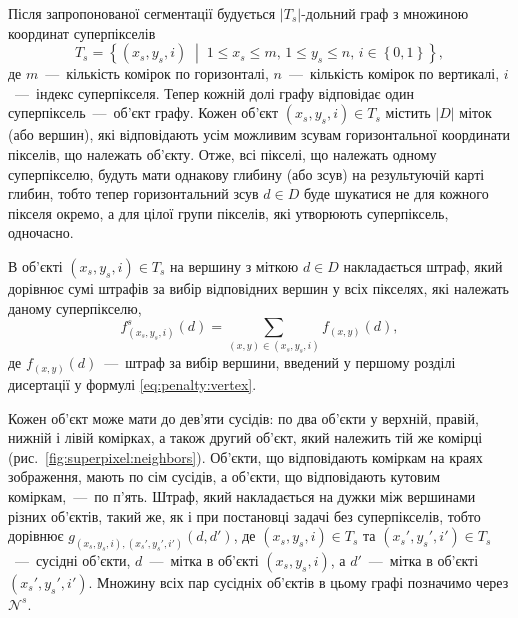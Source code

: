 Після запропонованої сегментації будується
$\left| T_s \right|$-дольний граф з множиною координат суперпікселів
\begin{equation*}
    T_s = \left\{
        \left(x_s, y_s, i \right) \; \middle| \;
        1 \le x_s \le m, \,
        1 \le y_s \le n, \,
        i \in \left\{ 0, 1 \right\}
    \right\},
\end{equation*}
де $m$~---~кількість комірок по горизонталі,
$n$~---~кількість комірок по вертикалі,
$i$~---~індекс суперпікселя.
Тепер кожній долі графу відповідає один суперпіксель~---~об'єкт графу.
Кожен об'єкт $\left(x_s, y_s, i \right) \in T_s$ містить
$ \left| D \right|$ міток (або вершин),
які відповідають усім можливим зсувам горизонтальної координати пікселів,
що належать об'єкту.
Отже, всі пікселі, що належать одному суперпікселю,
будуть мати однакову глибину (або зсув) на результуючій карті глибин,
тобто тепер горизонтальний зсув $d \in D$
буде шукатися не для кожного пікселя окремо, а для цілої групи пікселів,
які утворюють суперпіксель, одночасно.

В об'єкті $\left(x_s, y_s, i \right) \in T_s$ на вершину з міткою $d \in D$
накладається штраф,
який дорівнює сумі штрафів за вибір відповідних вершин у всіх пікселях,
які належать даному суперпікселю,
\begin{equation*}
    f_{\left(x_s, y_s, i\right)}^s \left( d \right) =
    \sum \limits_{\left(x, y \right) \in \left(x_s, y_s, i \right)}
        f_{\left(x, y \right)} \left( d \right),
\end{equation*}
де $f_{\left(x, y \right)} \left( d \right)$~---~штраф за вибір вершини,
введений у першому розділі дисертації у формулі \eqref{eq:penalty:vertex}.

Кожен об'єкт може мати до дев'яти сусідів: по два об'єкти у верхній, правій,
нижній і лівій комірках, а також другий об'єкт,
який належить тій же комірці (рис.~\ref{fig:superpixel:neighbors}).
Об'єкти, що відповідають коміркам на краях зображення, мають по сім сусідів,
а об'єкти, що відповідають кутовим коміркам,~---~по п'ять.
Штраф, який накладається на дужки між вершинами різних об'єктів, такий же,
як і при постановці задачі без суперпікселів, тобто дорівнює
$g_{\left(x_s, y_s, i \right), \left(x_s', y_s', i' \right)}
    \left(d, d' \right)$,
де $\left(x_s, y_s, i \right) \in T_s$ та
$\left(x_s', y_s', i' \right) \in T_s$~---~сусідні об'єкти,
$d$~---~мітка в об'єкті $\left(x_s, y_s, i \right)$,
а $d'$~---~мітка в об'єкті $\left(x_s', y_s', i' \right)$.
Множину всіх пар сусідніх об'єктів в цьому графі позначимо через $\mathcal{N}^s$.

